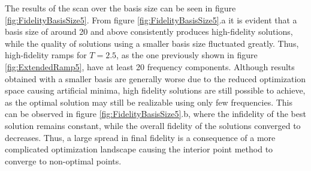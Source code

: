 The results of the scan over the basis size can be seen in figure \ref{fig:FidelityBasisSize5}. From figure \ref{fig:FidelityBasisSize5}.a it is evident that a basis size of around 20 and above consistently produces high-fidelity solutions, while the quality of solutions using a smaller basis size fluctuated greatly. Thus, high-fidelity ramps for $T = 2.5$, as the one previously shown in figure \ref{fig:ExtendedRamp5}, have at least 20 frequency components. Although results obtained with a smaller basis are generally worse due to the reduced optimization space causing artificial minima, high fidelity solutions are still possible to achieve, as the optimal solution may still be realizable using only few frequencies. This can be observed in figure \ref{fig:FidelityBasisSize5}.b, where the infidelity of the best solution remains constant, while the overall fidelity of the solutions converged to decreases. Thus, a large spread in final fidelity is a consequence of a more complicated optimization landscape causing the interior point method to converge to non-optimal points.
